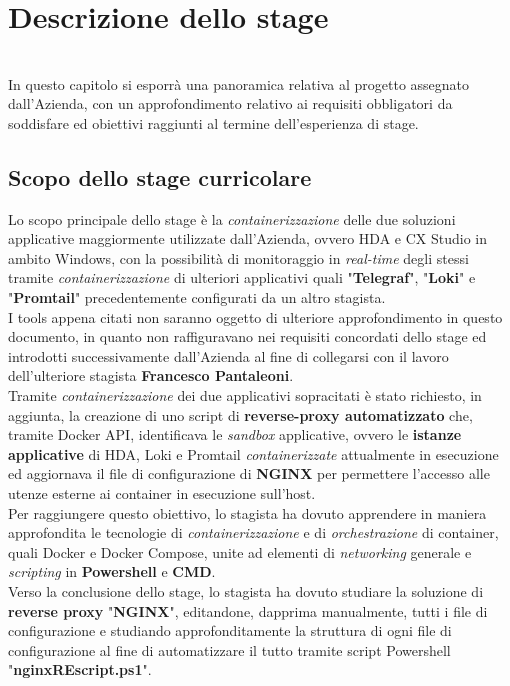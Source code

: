 
\chapter{Descrizione dello stage}
\label{cap:descrizione-stage}

\\
In questo capitolo si esporrà una panoramica relativa al progetto assegnato dall'Azienda, con un approfondimento relativo ai requisiti obbligatori da soddisfare ed obiettivi raggiunti al termine dell'esperienza di stage. 

\section{Scopo dello stage curricolare}
Lo scopo principale dello stage è la \textit{containerizzazione} delle due soluzioni applicative maggiormente utilizzate dall'Azienda, ovvero \gls{HDA} e \gls{CX Studio} in ambito Windows, con la possibilità di monitoraggio in \textit{real-time} degli stessi tramite \textit{containerizzazione} di ulteriori applicativi quali "\textbf{Telegraf}", "\textbf{Loki}" e "\textbf{Promtail}" precedentemente configurati da un altro stagista.\\
I tools appena citati non saranno oggetto di ulteriore approfondimento in questo documento, in quanto non raffiguravano nei requisiti concordati dello stage ed introdotti successivamente dall'Azienda al fine di collegarsi con il lavoro dell'ulteriore stagista \textbf{Francesco Pantaleoni}.\\
Tramite \textit{containerizzazione} dei due applicativi sopracitati è stato richiesto, in aggiunta, la creazione di uno script di \textbf{reverse-proxy automatizzato} che, tramite \gls{Docker API}, identificava le \textit{sandbox} applicative, ovvero le \textbf{istanze applicative} di HDA, Loki e Promtail \textit{containerizzate} attualmente in esecuzione ed aggiornava il file di configurazione di \textbf{\gls{NGINX}} per permettere l'accesso alle utenze esterne ai container in esecuzione sull'host.\\
Per raggiungere questo obiettivo, lo stagista ha dovuto apprendere in maniera approfondita le tecnologie di \textit{containerizzazione} e di \textit{orchestrazione} di container, quali \gls{Docker} e \gls{Docker Compose}, unite ad elementi di \textit{networking} generale e \textit{scripting} in \textbf{\gls{Powershell}} e \textbf{\gls{CMD}}. \\
Verso la conclusione dello stage, lo stagista ha dovuto studiare la soluzione di \textbf{reverse proxy} "\textbf{NGINX}", editandone, dapprima manualmente, tutti i file di configurazione e studiando approfonditamente la struttura di ogni file di configurazione al fine di automatizzare il tutto tramite script Powershell "\textbf{nginxREscript.ps1}".


